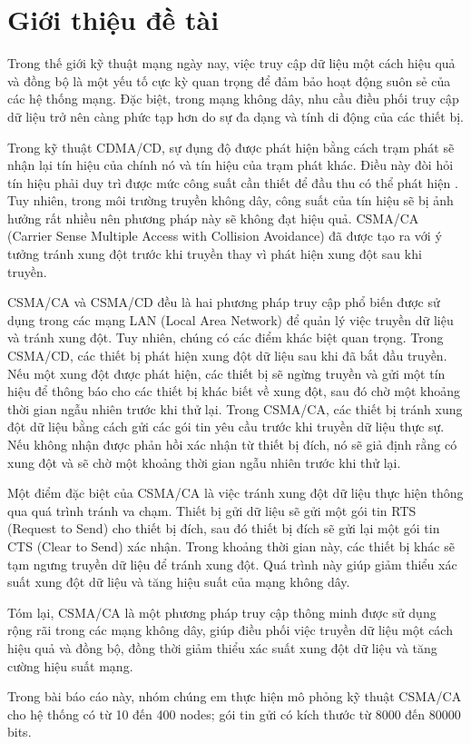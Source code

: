 %
\chapter{Giới thiệu đề tài}
Trong thế giới kỹ thuật mạng ngày nay, việc truy cập dữ liệu một cách hiệu quả và đồng bộ là một yếu tố cực kỳ 
quan trọng để đảm bảo hoạt động suôn sẻ của các hệ thống mạng. Đặc biệt, trong mạng không dây, nhu cầu điều phối 
truy cập dữ liệu trở nên càng phức tạp hơn do sự đa dạng và tính di động của các thiết bị. 

Trong kỹ thuật CDMA/CD, sự đụng độ được phát hiện bằng cách trạm phát sẽ nhận lại tín hiệu của chính nó và tín hiệu của
trạm phát khác. Điều này đòi hỏi tín hiệu phải duy trì được mức công suất cần thiết để đầu thu có thể phát hiện \cite{nam}. Tuy nhiên, 
trong môi trường truyền không dây, công suất của tín hiệu sẽ bị ảnh hưởng rất nhiều nên phương pháp này sẽ không đạt hiệu quả.
CSMA/CA (Carrier Sense Multiple Access with Collision Avoidance) đã được tạo ra với ý tưởng tránh xung đột trước khi truyền thay vì phát 
hiện xung đột sau khi truyền.

CSMA/CA và CSMA/CD đều là hai phương pháp truy cập phổ biến được sử dụng trong các mạng LAN (Local Area Network) để quản 
lý việc truyền dữ liệu và tránh xung đột. Tuy nhiên, chúng có các điểm khác biệt quan trọng. Trong CSMA/CD, các thiết bị 
phát hiện xung đột dữ liệu sau khi đã bắt đầu truyền. Nếu một xung đột được phát hiện, các thiết bị sẽ ngừng truyền và gửi 
một tín hiệu để thông báo cho các thiết bị khác biết về xung đột, sau đó chờ một khoảng thời gian ngẫu nhiên trước khi thử lại.
Trong CSMA/CA, các thiết bị tránh xung đột dữ liệu bằng cách gửi các gói tin yêu cầu trước khi truyền dữ liệu thực sự. Nếu không 
nhận được phản hồi xác nhận từ thiết bị đích, nó sẽ giả định rằng có xung đột và sẽ chờ một khoảng thời gian ngẫu nhiên trước khi thử lại.

Một điểm đặc biệt của CSMA/CA là việc tránh xung đột dữ liệu thực hiện thông qua quá trình tránh va chạm. Thiết bị gửi dữ liệu sẽ 
gửi một gói tin RTS (Request to Send) cho thiết bị đích, sau đó thiết bị đích sẽ gửi lại một gói tin CTS (Clear to Send) xác nhận. 
Trong khoảng thời gian này, các thiết bị khác sẽ tạm ngưng truyền dữ liệu để tránh xung đột. Quá trình này giúp giảm thiểu xác suất 
xung đột dữ liệu và tăng hiệu suất của mạng không dây.

Tóm lại, CSMA/CA là một phương pháp truy cập thông minh được sử dụng rộng rãi trong các mạng không dây, giúp điều phối việc truyền dữ 
liệu một cách hiệu quả và đồng bộ, đồng thời giảm thiểu xác suất xung đột dữ liệu và tăng cường hiệu suất mạng.

Trong bài báo cáo này, nhóm chúng em thực hiện mô phỏng kỹ thuật CSMA/CA cho hệ thống có từ 10 đến 400 nodes; gói tin gửi có kích thước từ 8000
đến 80000 bits.